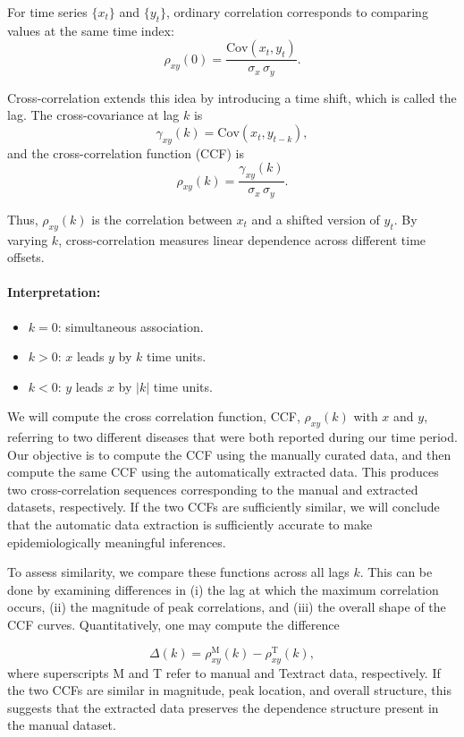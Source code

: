\documentclass[12pt]{article}
\begin{document}
For time series $\{x_t\}$ and $\{y_t\}$, ordinary correlation corresponds to comparing values at the same time index:
\[
\rho_{xy}(0) = 
\frac{\mathrm{Cov}(x_t, y_t)}{\sigma_x \, \sigma_y}.
\]

Cross-correlation extends this idea by introducing a time shift, which is called the lag. 
The cross-covariance at lag $k$ is
\[
\gamma_{xy}(k) = \mathrm{Cov}(x_t, y_{t-k}),
\]
and the cross-correlation function (CCF) is
\[
\rho_{xy}(k) = 
\frac{\gamma_{xy}(k)}{\sigma_x \, \sigma_y}.
\]

Thus, $\rho_{xy}(k)$ is the correlation between $x_t$ and a shifted version of $y_t$. 
By varying $k$, cross-correlation measures linear dependence across different time offsets.

\paragraph{Interpretation:}
\begin{itemize}
    \item $k = 0$: simultaneous association.
    \item $k > 0$: $x$ leads $y$ by $k$ time units.
    \item $k < 0$: $y$ leads $x$ by $|k|$ time units.
\end{itemize}



We will compute the cross correlation function, CCF, $\rho_{xy}(k)$ with $x$ and $y$, referring to two different diseases that were both reported during our time period. Our objective is to compute the CCF using the manually curated data, and then compute the same CCF using the automatically extracted data. This produces two cross-correlation sequences corresponding to the manual and extracted datasets, respectively. If the two CCFs are sufficiently similar, we will conclude that the automatic data extraction is sufficiently accurate to make epidemiologically meaningful inferences.


To assess similarity, we compare these functions across all lags $k$. This can be done by examining differences in (i) the lag at which the maximum correlation occurs, (ii) the magnitude of peak correlations, and (iii) the overall shape of the CCF curves. Quantitatively, one may compute the difference 


\[
\Delta(k) = \rho_{xy}^{\mathrm{M}}(k) - \rho_{xy}^{\mathrm{T}}(k),
\]
where superscripts M and T refer to manual and Textract data, respectively.  If the two CCFs are similar in magnitude, peak location, and overall structure, this suggests that the extracted data preserves the dependence structure present in the manual dataset.
\end{document}
